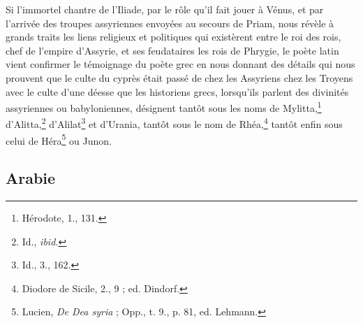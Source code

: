 \documentclass[a4paper, 11pt, oneside, polutonikogreek, french]{article}
\begin{document}
Si l'immortel chantre de l'Iliade, par le rôle qu'il fait jouer à Vénus, et par l'arrivée des troupes assyriennes envoyées au secours de Priam, nous révèle à grands traits les liens religieux et politiques qui existèrent entre le roi des rois, chef de l'empire d'Assyrie, et ses feudataires les rois de Phrygie, le poète latin vient confirmer le témoignage du poète grec en nous donnant des détails qui nous prouvent que le culte du cyprès était passé de chez les Assyriens chez les Troyens avec le culte d'une déesse que les historiens grecs, lorsqu'ils parlent des divinités assyriennes ou babyloniennes, désignent tantôt sous les noms de Mylitta,\footnote{Hérodote, 1., 131.} d'Alitta,\footnote{Id., \emph{ibid.}} d'Alilat\footnote{Id., 3., 162.} et d'Urania, tantôt sous le nom de Rhéa,\footnote{Diodore de Sicile, 2., 9 ; ed. Dindorf.} tantôt enfin sous celui de Héra\footnote{Lucien, \emph{De Dea syria} ; Opp., t. 9., p. 81, ed. Lehmann.} ou Junon.
\clearpage
\subsection{Arabie}
\end{document}
